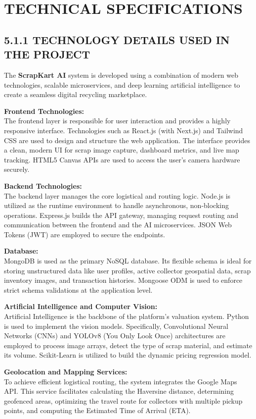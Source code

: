 \chapter{TECHNICAL SPECIFICATIONS}

\section{5.1.1 TECHNOLOGY DETAILS USED IN THE PROJECT}
The \textbf{ScrapKart AI} system is developed using a combination of modern web technologies, scalable microservices, and deep learning artificial intelligence to create a seamless digital recycling marketplace. 

\textbf{Frontend Technologies:}\\
The frontend layer is responsible for user interaction and provides a highly responsive interface. Technologies such as React.js (with Next.js) and Tailwind CSS are used to design and structure the web application. The interface provides a clean, modern UI for scrap image capture, dashboard metrics, and live map tracking. HTML5 Canvas APIs are used to access the user's camera hardware securely.

\textbf{Backend Technologies:}\\
The backend layer manages the core logistical and routing logic. Node.js is utilized as the runtime environment to handle asynchronous, non-blocking operations. Express.js builds the API gateway, managing request routing and communication between the frontend and the AI microservices. JSON Web Tokens (JWT) are employed to secure the endpoints.

\textbf{Database:}\\
MongoDB is used as the primary NoSQL database. Its flexible schema is ideal for storing unstructured data like user profiles, active collector geospatial data, scrap inventory images, and transaction histories. Mongoose ODM is used to enforce strict schema validations at the application level.

\textbf{Artificial Intelligence and Computer Vision:}\\
Artificial Intelligence is the backbone of the platform's valuation system. Python is used to implement the vision models. Specifically, Convolutional Neural Networks (CNNs) and YOLOv8 (You Only Look Once) architectures are employed to process image arrays, detect the type of scrap material, and estimate its volume. Scikit-Learn is utilized to build the dynamic pricing regression model.

\textbf{Geolocation and Mapping Services:}\\
To achieve efficient logistical routing, the system integrates the Google Maps API. This service facilitates calculating the Haversine distance, determining geofenced areas, optimizing the travel route for collectors with multiple pickup points, and computing the Estimated Time of Arrival (ETA).
